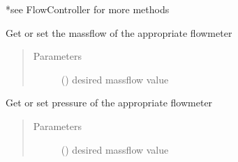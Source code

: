 \documentclass[letterpaper,10pt,english]{sphinxmanual}
\begin{document}
\begin{fulllineitems}
*see FlowController for more methods

\begin{fulllineitems}
\label{\detokenize{source/laboratory.drivers:laboratory.drivers.mfc.AlicatController.get_all}}
\end{fulllineitems}


\begin{fulllineitems}
\label{\detokenize{source/laboratory.drivers:laboratory.drivers.mfc.AlicatController.massflow}}
Get or set the massflow of the appropriate flowmeter
\begin{quote}\begin{description}
\item[{Parameters}] \leavevmode
{} () \textendash{} desired massflow value

\end{description}\end{quote}

\end{fulllineitems}


\begin{fulllineitems}
\label{\detokenize{source/laboratory.drivers:laboratory.drivers.mfc.AlicatController.pressure}}
Get or set pressure of the appropriate flowmeter
\begin{quote}\begin{description}
\item[{Parameters}] \leavevmode
{} () \textendash{} desired massflow value

\end{description}\end{quote}


\end{fulllineitems}
\end{fulllineitems}
\end{document}
